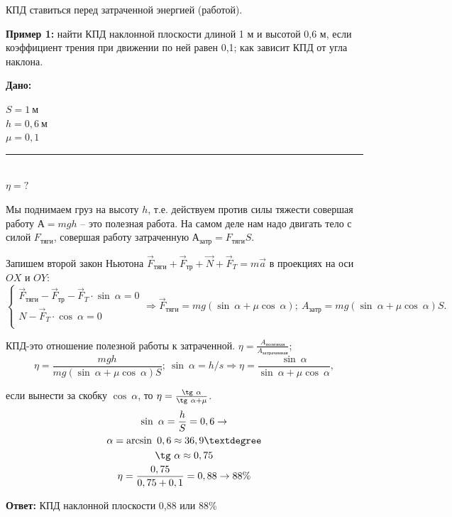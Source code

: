 \documentclass[a6paper, 11pt]{diss_4}
\renewcommand{\'}{\,'}
\begin{document}
КПД ставиться перед затраченной энергией (работой).

\textbf{Пример 1:} найти КПД наклонной плоскости длиной 1 м и высотой 0,6 м, если коэффициент трения при движении по ней равен 0,1; как зависит КПД от угла наклона.

\hspace{1cm}\textbf{Дано:}\hspace{.3cm}
\parbox[t]{4cm}{
$S= 1\ м$\\
$h= 0,6\ м$\\
$\mu=0,1$\\
\rule{4cm}{.4pt}\\
$\eta = ?$\\
}


Мы поднимаем груз на высоту $h$, т.е. действуем против силы тяжести совершая работу $А=mgh$ -- это полезная работа. На  самом деле нам надо двигать тело с силой $F_{тяги}$, совершая работу затраченную $А_{затр}= F_{тяги}S$.

Запишем второй закон Ньютона $\vec{F}_{тяги}+\vec{F}_{тр}+\vec{N}+\vec{F}_{T}=m\vec{a}$ в проекциях на оси $OX$ и $OY$:
\begin{equation*}
     \left\{
          \begin{array}{lr}
 \vec{F}_{тяги}-\vec{F}_{тр}-\vec{F}_{T}\cdot\sin\ \alpha=0\\
 N-\vec{F}_{T}\cdot\cos\ \alpha=0\\
          \end{array}\Rightarrow
\vec{F}_{тяги}=mg(\sin\ \alpha+\mu\cos\ \alpha);\ A_{затр}=mg(\sin\ \alpha+\mu\cos\ \alpha)S.
     \right.
\end{equation*}

КПД-это отношение полезной работы к затраченной. $\eta=\frac{A_{полезная}}{A_{затраченная}}$;
\[
\eta=\frac{mgh}{mg(\sin\ \alpha+\mu\cos\ \alpha)S};\ \sin\ \alpha=h/s\Rightarrow
\eta=\frac{\sin\ \alpha}{\sin\ \alpha+\mu\cos\ \alpha},
\]

если вынести за скобку $\cos\ \alpha$, то $\eta=\frac{\tg\ \alpha}{\tg\ \alpha+\mu}$.
\begin{gather*}
\sin\ \alpha=\frac{h}{S}=0,6\to\\
\alpha=\arcsin\ 0,6\approx36,9\textdegree\\
\tg\ \alpha\approx0,75\\
\eta=\frac{0,75}{0,75+0,1}=0,88\to88\%
\end{gather*}

\textbf{Ответ:} КПД наклонной плоскости 0,88 или 88\%
\end{document}
